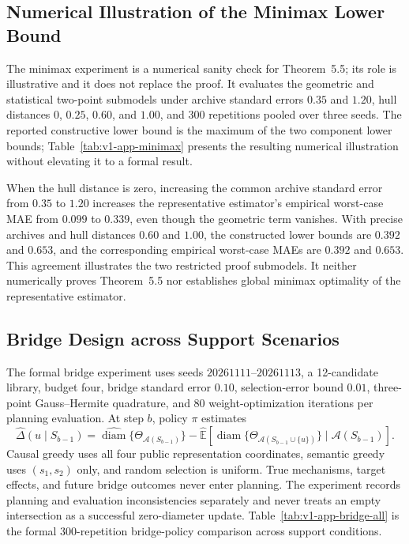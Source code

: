 \documentclass[11pt]{article}
\numberwithin{equation}{section}
\newcommand{\E}{\mathbb E}
\newcommand{\1}{\mathbf 1}
\newcommand{\cA}{\mathcal A}
\begin{document}
\subsection{Numerical Illustration of the Minimax Lower Bound}
\label{app:minimax-check}
\suppressfloats[t]

The minimax experiment is a numerical sanity check for Theorem~5.5; its role is illustrative and it does not replace the proof.  It evaluates the geometric and statistical two-point submodels under archive standard errors $0.35$ and $1.20$, hull distances $0$, $0.25$, $0.60$, and $1.00$, and 300 repetitions pooled over three seeds.  The reported constructive lower bound is the maximum of the two component lower bounds; Table~\ref{tab:v1-app-minimax} presents the resulting numerical illustration without elevating it to a formal result.



When the hull distance is zero, increasing the common archive standard error from $0.35$ to $1.20$ increases the representative estimator's empirical worst-case MAE from $0.099$ to $0.339$, even though the geometric term vanishes.  With precise archives and hull distances $0.60$ and $1.00$, the constructed lower bounds are $0.392$ and $0.653$, and the corresponding empirical worst-case MAEs are $0.392$ and $0.653$.  This agreement illustrates the two restricted proof submodels.  It neither numerically proves Theorem~5.5 nor establishes global minimax optimality of the representative estimator.


\subsection{Bridge Design across Support Scenarios}
\label{app:bridge-design}
\suppressfloats[t]

The formal bridge experiment uses seeds $20261111$--$20261113$, a 12-candidate library, budget four, bridge standard error $0.10$, selection-error bound $0.01$, three-point Gauss--Hermite quadrature, and 80 weight-optimization iterations per planning evaluation.  At step $b$, policy $\pi$ estimates
\begin{equation}
\label{eq:v1-app-bridge-value}
\widehat\Delta(u\mid S_{b-1})
=\widehat{\operatorname{diam}}\{\Theta_{\cA(S_{b-1})}\}
-\widehat{\E}\!\left[
\operatorname{diam}\{\Theta_{\cA(S_{b-1}\cup\{u\})}\}
\mid \cA(S_{b-1})\right].
\end{equation}
Causal greedy uses all four public representation coordinates, semantic greedy uses $(s_1,s_2)$ only, and random selection is uniform.  True mechanisms, target effects, and future bridge outcomes never enter planning.  The experiment records planning and evaluation inconsistencies separately and never treats an empty intersection as a successful zero-diameter update. Table~\ref{tab:v1-app-bridge-all} is the formal 300-repetition bridge-policy comparison across support conditions.
\end{document}
